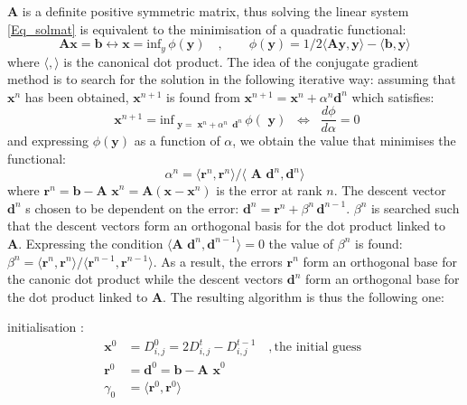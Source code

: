 \textbf{A} is a definite positive symmetric matrix, thus solving the linear 
system \eqref{Eq_solmat} is equivalent to the minimisation of a quadratic 
functional:
\begin{equation*}
\textbf{Ax} = \textbf{b} \leftrightarrow \textbf{x} =\text{inf}_{y} \,\phi (\textbf{y})
\quad , \qquad
\phi (\textbf{y}) = 1/2 \langle \textbf{Ay},\textbf{y}\rangle - \langle \textbf{b},\textbf{y} \rangle 
\end{equation*}
where $\langle , \rangle$ is the canonical dot product. The idea of the 
conjugate gradient method is to search for the solution in the following 
iterative way: assuming that $\textbf{x}^n$ has been obtained, $\textbf{x}^{n+1}$ 
is found from $\textbf {x}^{n+1}={\textbf {x}}^n+\alpha^n{\textbf {d}}^n$ which satisfies:
\begin{equation*}
{\textbf{ x}}^{n+1}=\text{inf} _{{\textbf{ y}}={\textbf{ x}}^n+\alpha^n \,{\textbf{ d}}^n} \,\phi ({\textbf{ y}})\;\;\Leftrightarrow \;\;\frac{d\phi }{d\alpha}=0
\end{equation*}
and expressing $\phi (\textbf{y})$ as a function of \textit{$\alpha $}, we obtain the 
value that minimises the functional: 
\begin{equation*}
\alpha ^n = \langle{ \textbf{r}^n , \textbf{r}^n} \rangle  / \langle {\textbf{ A d}^n, \textbf{d}^n} \rangle
\end{equation*}
where $\textbf{r}^n = \textbf{b}-\textbf{A x}^n = \textbf{A} (\textbf{x}-\textbf{x}^n)$ 
is the error at rank $n$. The descent vector $\textbf{d}^n$ s chosen to be dependent 
on the error: $\textbf{d}^n = \textbf{r}^n + \beta^n \,\textbf{d}^{n-1}$. $\beta ^n$ 
is searched such that the descent vectors form an orthogonal basis for the dot 
product linked to \textbf{A}. Expressing the condition 
$\langle \textbf{A d}^n, \textbf{d}^{n-1} \rangle = 0$ the value of $\beta ^n$ is found:
 $\beta ^n = \langle{ \textbf{r}^n , \textbf{r}^n} \rangle  / \langle {\textbf{r}^{n-1}, \textbf{r}^{n-1}} \rangle$. 
 As a result, the errors $ \textbf{r}^n$ form an orthogonal 
base for the canonic dot product while the descent vectors $\textbf{d}^n$ form 
an orthogonal base for the dot product linked to \textbf{A}. The resulting 
algorithm is thus the following one:

initialisation :
\begin{equation*} 
\begin{split}
\textbf{x}^0 &= D_{i,j}^0   = 2 D_{i,j}^t - D_{i,j}^{t-1}       \quad, \text{the initial guess }     \\
\textbf{r}^0 &= \textbf{d}^0 = \textbf{b} - \textbf{A x}^0       \\
\gamma_0 &= \langle{ \textbf{r}^0 , \textbf{r}^0} \rangle
\end{split}
\end{equation*}

